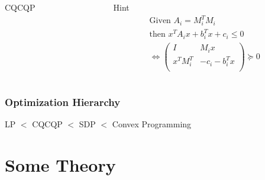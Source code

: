 \documentclass[11pt]{beamer}
\begin{document}
\begin{frame}
\begin{itemize}[leftmargin=-0.3cm]
\begin{columns}
\begin{column}{0.5\textwidth}
\begin{block}{CQCQP}
		\vspace{4ex}
		\end{block}
		\end{column}
		\begin{column}{0.5\textwidth}
			\begin{block}{Hint}
			\scriptsize
			\begin{equation*}
			\begin{aligned}
			\text{Given }A_i=M_i^TM_i&\\
			\text{then }x^TA_ix+b_i^Tx+c_i\leq 0 \\
			\Leftrightarrow\begin{pmatrix}
			I & M_ix\\
			x^TM_i^T & -c_i-b_i^Tx\\
			\end{pmatrix}
			\succeq 0
			\end{aligned}
			\end{equation*}
			\end{block}
		\end{column}
		\end{columns}
		\end{itemize}
	\end{frame}
	\begin{frame}
		\frametitle{Optimization Hierarchy}
		\begin{block}{\vspace{-3ex}}
			\centering \large LP $<$ CQCQP $<$ SDP $<$ Convex Programming
		\end{block}
	\end{frame}


\section{Some Theory}
\end{document}
